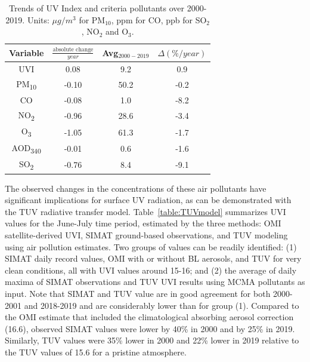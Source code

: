 \documentclass[journal=jacsat,manuscript=article]{achemso}
\begin{document}
\begin{table}[H]
  \centering
  \begin{tabular}{cccc} \hline
    Variable               & $\frac{\text{absolute change}}{year}$ & Avg$_{2000-2019}$ & $\Delta(\%/year)$ \\ \hline
    UVI                    & 0.08                                  & 9.2               & 0.9               \\
    PM\textsubscript{10}   & -0.10                                 & 50.2              & -0.2              \\
    CO                     & -0.08                                 & 1.0               & -8.2              \\
    NO\textsubscript{2}    & -0.96                                 & 28.6              & -3.4              \\
    O\textsubscript{3}     & -1.05                                 & 61.3              & -1.7              \\
    AOD\textsubscript{340} & -0.01                                 & 0.6               & -1.6              \\
    SO\textsubscript{2}    & -0.76                                 & 8.4               & -9.1              \\
    \hline
  \end{tabular}
  \caption{{{{Trends of UV Index and criteria pollutants over 2000-2019.
                Units: $\mu g/m^3$ for PM$_{10}$, ppm for CO, ppb for SO$_2$, NO$_2$ and O$_3$.}}}}
  \label{table:uvindex}
\end{table}

The observed changes in the concentrations of these air pollutants have
significant implications for surface UV radiation, as can be
demonstrated with the TUV radiative transfer model.
Table~{\ref{table:TUVmodel}} summarizes UVI values for
the June-July time period, estimated by the three methods: OMI
satellite-derived UVI, SIMAT ground-based observations, and TUV modeling
using air pollution estimates. Two groups of values can be readily
identified: (1) SIMAT daily record values, OMI with or without BL
aerosols, and TUV for very clean conditions, all with UVI values around
15-16; and (2) the average of daily maxima of SIMAT observations and TUV UVI results using
MCMA pollutants as input. Note that SIMAT and TUV value are in good agreement
for both 2000-2001 and 2018-2019 and are considerably lower than for group (1). Compared to the OMI
estimate that included the climatological absorbing aerosol correction (16.6),
observed SIMAT values were lower by 40\% in 2000 and by 25\% in 2019.
Similarly, TUV values were 35\% lower in 2000 and 22\% lower in 2019
relative to the TUV values of 15.6 for a pristine atmosphere.
\end{document}
